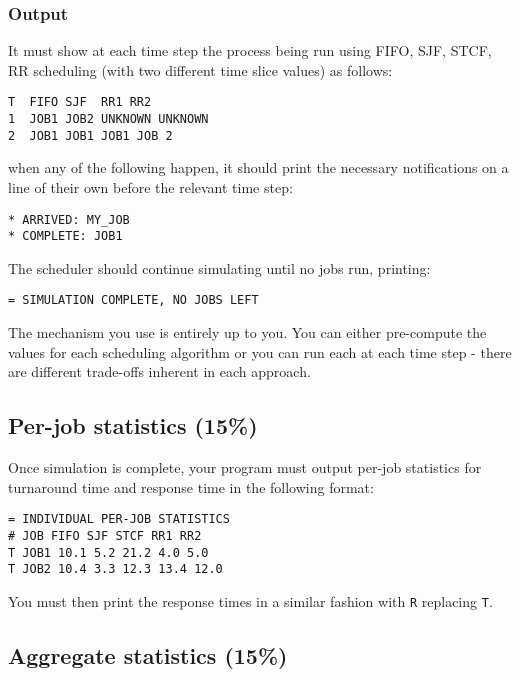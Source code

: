 \documentclass[10pt]{article}
\begin{document}
\subsubsection{Output}

It must show at each time step the process being run using FIFO, SJF, STCF, RR scheduling (with two different time slice values) as follows:

\begin{verbatim}
T  FIFO SJF  RR1 RR2
1  JOB1 JOB2 UNKNOWN UNKNOWN
2  JOB1 JOB1 JOB1 JOB 2
\end{verbatim}

when any of the following happen, it should print the necessary notifications on a line of their own before the relevant time step: 

\begin{verbatim}
* ARRIVED: MY_JOB
* COMPLETE: JOB1
\end{verbatim}

The scheduler should continue simulating until no jobs run, printing:

\begin{verbatim}
= SIMULATION COMPLETE, NO JOBS LEFT
\end{verbatim}

The mechanism you use is entirely up to you. You can either pre-compute the values for each scheduling algorithm or you can run each at each time step - there are different trade-offs inherent in each approach.


\subsection{Per-job statistics (15\%)}

Once simulation is complete, your program must output per-job statistics for turnaround time and response time in the following format: 

\begin{verbatim}
= INDIVIDUAL PER-JOB STATISTICS
# JOB FIFO SJF STCF RR1 RR2
T JOB1 10.1 5.2 21.2 4.0 5.0
T JOB2 10.4 3.3 12.3 13.4 12.0

\end{verbatim}

You must then print the response times in a similar fashion with \texttt{R} replacing \texttt{T}.


\subsection{Aggregate statistics (15\%)}
\end{document}
